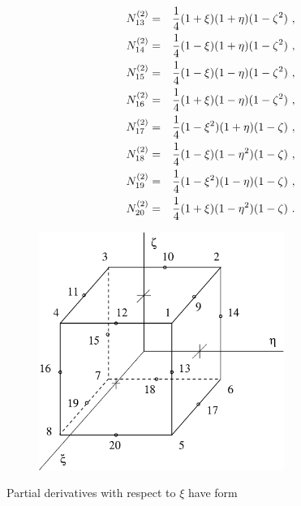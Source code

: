 \begin{eqnarray}
N_{13}^{(2)} &=& \del{1}{4} (1 + \xi) (1 + \eta) (1 - \zeta^2)\ ,
\\ \label{bfquadhexn14}
N_{14}^{(2)} &=& \del{1}{4} (1 - \xi) (1 + \eta) (1 - \zeta^2)\ ,
\\ \label{bfquadhexn15}
N_{15}^{(2)} &=& \del{1}{4} (1 - \xi) (1 - \eta) (1 - \zeta^2)\ ,
\\ \label{bfquadhexn16}
N_{16}^{(2)} &=& \del{1}{4} (1 + \xi) (1 - \eta) (1 - \zeta^2)\ ,
\\ \label{bfquadhexn17}
N_{17}^{(2)} &=& \del{1}{4} (1 - \xi^2) (1 + \eta) (1 - \zeta)\ ,
\\ \label{bfquadhexn18}
N_{18}^{(2)} &=& \del{1}{4} (1 - \xi) (1 - \eta^2) (1 - \zeta)\ ,
\\ \label{bfquadhexn19}
N_{19}^{(2)} &=& \del{1}{4} (1 - \xi^2) (1 - \eta) (1 - \zeta)\ ,
\\ \label{bfquadhexn20}
N_{20}^{(2)} &=& \del{1}{4} (1 + \xi) (1 - \eta^2) (1 - \zeta)\ .
\end{eqnarray}
\begin{figure}
\begin{center}
\includegraphics[width=80mm]{FIG/quadhex.eps}
\end{center}
\end{figure}
Partial derivatives with respect to $\xi$ have form
